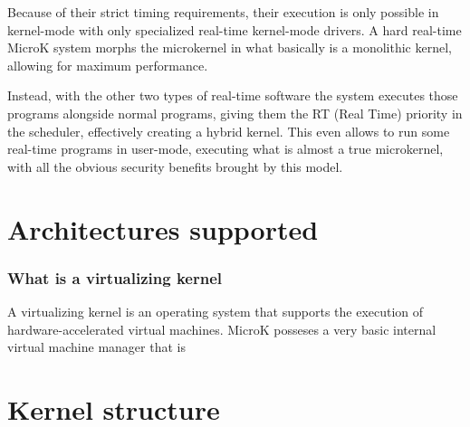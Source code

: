 \documentclass{report}
\begin{document}
Because of their strict timing requirements, their execution is only possible in kernel-mode with only specialized real-time kernel-mode drivers. A hard real-time MicroK system morphs the microkernel in what basically is a monolithic kernel, allowing for maximum performance.

Instead, with the other two types of real-time software the system executes those programs alongside normal programs, giving them the RT (Real Time) priority in the scheduler, effectively creating a hybrid kernel. This even allows to run some real-time programs in user-mode, executing what is almost a true microkernel, with all the obvious security benefits brought by this model.

\chapter{Architectures supported}


\subsection{What is a virtualizing kernel}
A virtualizing kernel is an operating system that supports the execution of hardware-accelerated virtual machines. 
MicroK posseses a very basic internal virtual machine manager that is 

\chapter{Kernel structure}
\end{document}
